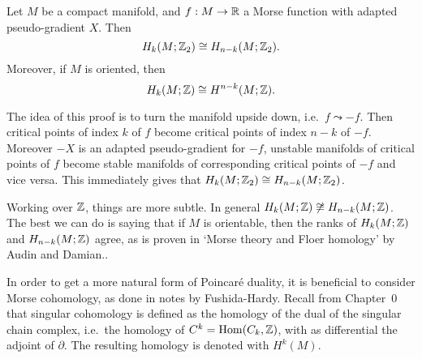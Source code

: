\begin{theorem}
    Let $M$ be a compact manifold, and $f: M \to  \mathbb{R}$ a Morse function with adapted pseudo-gradient $X$.
    Then
    \[
        H_k(M; \mathbb{Z}_2) \cong H_{n-k}(M; \mathbb{Z}_2)
    .\]
    Moreover, if $M$ is oriented, then \[
         H_{k}(M; \mathbb{Z}) \cong H^{n-k}(M; \mathbb{Z})
    .\]
\end{theorem}
\begin{myproof}
    The idea of this proof is to turn the manifold upside down, i.e.\ $f\leadsto -f$.
    Then critical points of index $k$ of $f$  become critical points of index $n-k$ of  $-f$.
    Moreover $-X$ is an adapted pseudo-gradient for $-f$, unstable manifolds of critical points of $f$ become stable manifolds of corresponding critical points of $-f$ and vice versa.
    This immediately gives that $H_k(M; \mathbb{Z}_2) \cong H_{n-k}(M; \mathbb{Z}_2)$.

    Working over $\mathbb{Z}$, things are more subtle.
    In general $H_k(M; \mathbb{Z}) \not \cong H_{n-k}(M; \mathbb{Z})$.
    The best we can do is saying that if $M$ is orientable, then the ranks of  $H_k(M; \mathbb{Z})$ and $H_{n-k}(M; \mathbb{Z})$ agree,
    as is proven in `Morse theory and Floer homology' by Audin and Damian..

    In order to get a more natural form of Poincaré duality, it is beneficial to consider Morse cohomology, as done in notes by Fushida-Hardy.
    Recall from Chapter~0 that singular cohomology is defined as the homology of the dual of the singular chain complex, i.e.\ the homology of $C^{k} = \operatorname{Hom}(C_k, \mathbb{Z})$, with as differential the adjoint of $\partial$. The resulting homology is denoted with $H^{k}(M)$.


\end{myproof}

